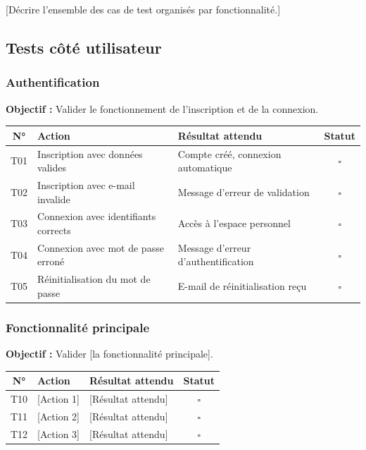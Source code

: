 \documentclass[12pt, a4paper]{article}
\begin{document}
[Décrire l'ensemble des cas de test organisés par fonctionnalité.]

\subsection{Tests côté utilisateur}

\subsubsection{Authentification}

\noindent\textbf{Objectif :} Valider le fonctionnement de l'inscription et de la connexion.

\begin{center}
\begin{tabular}{|c|L{4cm}|L{4cm}|c|}
  \hline
  \color{white}\textbf{N°} &
  \color{white}\textbf{Action} &
  \color{white}\textbf{Résultat attendu} &
  \color{white}\textbf{Statut} \\
  \hline
  T01 & Inscription avec données valides &
        Compte créé, connexion automatique & $\square$ \\
  \hline
  T02 & Inscription avec e-mail invalide &
        Message d'erreur de validation & $\square$ \\
  \hline
  T03 & Connexion avec identifiants corrects &
        Accès à l'espace personnel & $\square$ \\
  \hline
  T04 & Connexion avec mot de passe erroné &
        Message d'erreur d'authentification & $\square$ \\
  \hline
  T05 & Réinitialisation du mot de passe &
        E-mail de réinitialisation reçu & $\square$ \\
  \hline
\end{tabular}
\end{center}

\subsubsection{Fonctionnalité principale}

\noindent\textbf{Objectif :} Valider [la fonctionnalité principale].

\begin{center}
\begin{tabular}{|c|L{4cm}|L{4cm}|c|}
  \hline
  \color{white}\textbf{N°} &
  \color{white}\textbf{Action} &
  \color{white}\textbf{Résultat attendu} &
  \color{white}\textbf{Statut} \\
  \hline
  T10 & [Action 1] & [Résultat attendu] & $\square$ \\
  \hline
  T11 & [Action 2] & [Résultat attendu] & $\square$ \\
  \hline
  T12 & [Action 3] & [Résultat attendu] & $\square$ \\
  \hline
\end{tabular}
\end{center}
\end{document}
